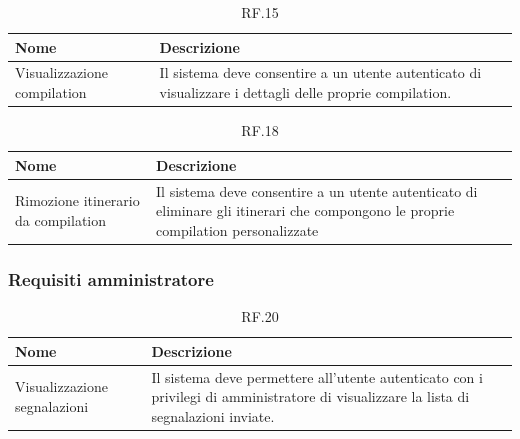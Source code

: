 \documentclass{natourDoc}
\begin{document}
\begin{table}[H]
	\centering
	\begin{tabular}{ |p{5cm}|p{10.3cm}| }
		\hline
		\rowcolor{PineGreen!70}
		\textbf{Nome}               & \textbf{Descrizione}                                                          \\
		\hline
		Visualizzazione compilation & Il sistema deve consentire a un utente autenticato di visualizzare i dettagli
		delle proprie compilation.                                                                                  \\
		\hline
	\end{tabular}
	\caption{RF.15}
	\label{table:15}
\end{table}


\begin{table}[H]
	\centering
	\begin{tabular}{ |p{5cm}|p{10.3cm}| }
		\hline
		\rowcolor{PineGreen!70}
		\textbf{Nome}                       & \textbf{Descrizione}                                                          \\
		\hline
		Rimozione itinerario da compilation & Il sistema deve consentire a un utente autenticato di eliminare gli itinerari
		che compongono le proprie compilation personalizzate                                                                \\
		\hline
	\end{tabular}
	\caption{RF.18}
	\label{table:18}
\end{table}

\subsubsection{Requisiti amministratore}
\begin{table}[H]
	\centering
	\begin{tabular}{ |p{5cm}|p{10.3cm}| }
		\hline
		\rowcolor{PineGreen!70}
		\textbf{Nome}                & \textbf{Descrizione}                                                                                \\
		\hline
		Visualizzazione segnalazioni & Il sistema deve permettere all'utente autenticato con i privilegi di amministratore di visualizzare
		la lista di segnalazioni inviate.                                                                                                  \\
		\hline
	\end{tabular}
	\caption{RF.20}
	\label{table:20}
\end{table}
\end{document}

